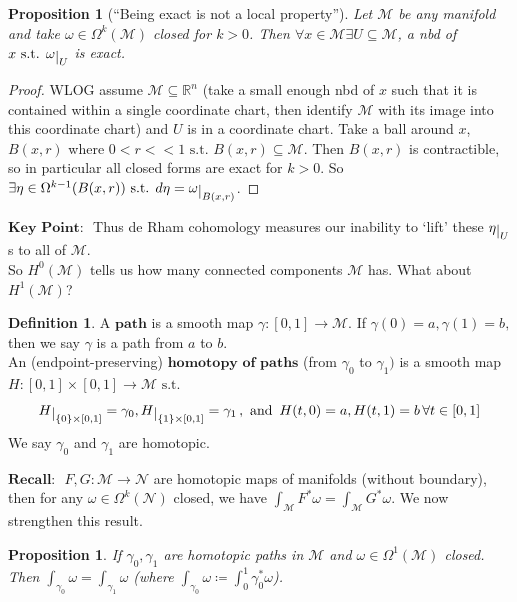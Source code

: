 \documentclass[10pt]{article}
\theoremstyle{plain}
\newtheorem{prop}[thm]{Proposition}
\theoremstyle{definition}
\newtheorem{defn}[thm]{Definition} %
\newcommand{\myand}{\text{ and }}
\newcommand{\st}{\text{ s.t. }}
\newcommand{\Recall}{\textbf{Recall: }}
\newcommand{\KeyPoint}{\textbf{Key Point: }}
\newcommand{\Real}{\mathbb{R}}
\newcommand{\man}{\mathcal{M}}
\newcommand{\nan}{\mathcal{N}}
\newcommand{\xman}{x\in\man}
\newcommand{\pformman}[1]{\Omega^{#1}(\man)}
\newcommand{\pformnan}[1]{\Omega^{#1}(\nan)}
\newcommand{\deriv}{d}
\newcommand{\deta}{\deriv\eta}
\def\restrict#1{\raise-.5ex\hbox{\ensuremath|}_{#1}}
\newcommand{\cohomman}[1]{H^{#1}(\man)}
\newcommand{\inter}{\left[0,1\right]}
\begin{document}
\begin{prop}[``Being exact is not a local property'']
Let $\man$ be any manifold and take $\omega \in \pformman{k}$ closed for $k> 0$. Then $\forall \xman \exists U \subseteq\man $, a nbd of $x \st \omega\restrict{U}$ is exact. 
\end{prop}
\begin{proof}
WLOG assume $\man \subseteq \Real^n$ (take a small enough nbd of $x$ such that it is contained within a single coordinate chart, then identify $\man$ with its image into this coordinate chart) and $U$ is in a coordinate chart. Take a ball around $x$, $B(x,r)$ where $0<r<<1 \st B(x,r) \subseteq \man.$ Then $B(x,r)$ is contractible, so in particular all closed forms are exact for $k>0$. So $\exists \eta \in \Omega^{k-1}(B(x,r)) \st \deta =\omega\restrict{B(x,r)}$.
\end{proof}\noindent
$\KeyPoint$ Thus de Rham cohomology measures our inability to `lift' these $\eta\restrict{U}$s to all of $\man$.\\
So $\cohomman{0}$ tells us how many connected components $\man$ has. What about $\cohomman{1}$?
\begin{defn}
A $\textbf{path}$ is a smooth map $\gamma : \inter \to \man.$ If $\gamma(0) = a, \gamma(1) = b,$ then we say $\gamma $ is a path from $a$ to $b$. 
\\An (endpoint-preserving) $\textbf{homotopy of paths}$ (from $\gamma_0$ to $\gamma_1)$ is a smooth map $H:\inter\times\inter \to \man \st$$$
H\restrict{\{0\}\times\inter} = \gamma_0, H\restrict{\{1\}\times\inter} = \gamma_1\,, \myand \,H(t,0) = a, H(t,1) = b \,\forall t \in \inter$$
We say $\gamma_0$ and $\gamma_1$ are homotopic.
\end{defn}
$\Recall$ $F,G:\man \to \nan$ are homotopic maps of manifolds (without boundary), then for any $\omega\in\pformnan{k}$ closed, we have $\int_\man F^*\omega = \int_\man G^*\omega$. We now strengthen this result.
\begin{prop}\label{prop:integralofhomotopicpathsequal}
If $\gamma_0,\gamma_1$ are homotopic paths in $\man $ and $\omega \in\pformman{1}$ closed. Then  $\int_{\gamma_{0}}\omega = \int_{\gamma_1} \omega$ (where $\int_{\gamma_0} \omega \coloneqq \int_0^1 \gamma_0^* \omega$).
\end{prop}\noindent
\end{document}
